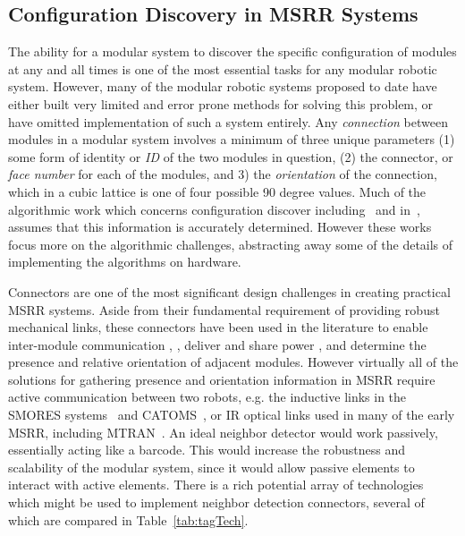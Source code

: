 \subsection{Configuration Discovery in MSRR Systems}
\label{ssec:RWconfiguration}
The ability for a modular system to discover the specific configuration of modules at any and all times is one of the most essential tasks for any modular robotic system. However, many of the modular robotic systems proposed to date have either built very limited and error prone methods for solving this problem, or have omitted implementation of such a system entirely. Any \textit{connection} between modules in a modular system involves a minimum of three unique parameters (1) some form of identity or \textit{ID} of the two modules in question, (2) the connector, or \textit{face number} for each of the modules, and 3) the \textit{orientation} of the connection, which in a cubic lattice is one of four possible 90 degree values. Much of the algorithmic work which concerns configuration discover including~\cite{park2008automatic} and in~\cite{Funiak-IJRR09}, assumes that this information is accurately determined. However these works focus more on the algorithmic challenges, abstracting away some of the details of implementing the algorithms on hardware.

Connectors are one of the most significant design challenges in creating practical MSRR systems. Aside from their fundamental requirement of providing robust mechanical links, these connectors have been used in the literature to enable inter-module communication \cite{liedke2013collective}, \cite{TosunDaveyLiuYim-IROS2016}, deliver and share power \cite{OptimalPowerSharing2016}, and determine the presence and relative orientation of adjacent modules. However virtually all of the solutions for gathering presence and orientation information in MSRR require active communication between two robots, e.g. the inductive links in the SMORES systems~\cite{TosunDaveyLiuYim-IROS2016} and CATOMS~\cite{Kirby-IROS07}, or IR optical links used in many of the early MSRR, including MTRAN~\cite{Kurokawa-IJRR08}. An ideal neighbor detector would work passively, essentially acting like a barcode. This would increase the robustness and scalability of the modular system, since it would allow passive elements to interact with active elements. There is a rich potential array of technologies which might be used to implement neighbor detection connectors, several of which are compared in Table~\ref{tab:tagTech}.

